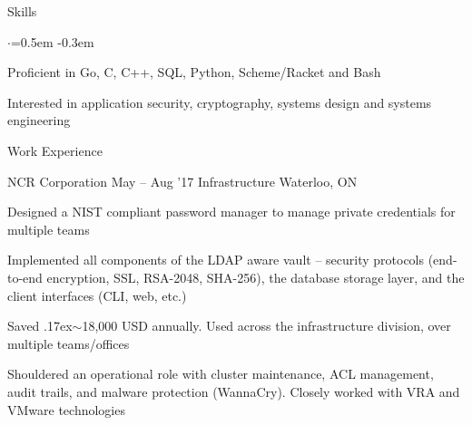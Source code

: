 \documentclass{resume} %
\begin{document}

\begin{rSection}{Skills}
  \vspace {0.3em}
  \begin{list}{$\cdot$}{\leftmargin=0.5em}
    \itemsep -0.3em \vspace{-0.3em}
    \item Proficient in Go, C, C++, SQL, Python, Scheme/Racket and Bash
    \item Interested in application security, cryptography, systems design and
      systems engineering
  \end{list}
  \vspace{0.3em}
\end{rSection}



\begin{rSection}{Work Experience}
  \begin{rSubsection}{NCR Corporation}
		     {May -- Aug '17}
		     {Infrastructure}
		     {Waterloo, ON}
    \item Designed a NIST compliant password manager to manage private
      credentials for multiple teams
    \item Implemented all components of the LDAP aware vault -- security
      protocols (end-to-end encryption, SSL, RSA-2048, SHA-256), the database
      storage layer, and the client interfaces (CLI, web, etc.)
    \item Saved {\raise.17ex\hbox{$\scriptstyle\mathtt{\sim}$}}18,000 USD
      annually. Used across the infrastructure division, over multiple
      teams/offices
    \item Shouldered an operational role with cluster maintenance, ACL management,
      audit trails, and malware protection (WannaCry). Closely worked with VRA
      and VMware technologies
  \end{rSubsection}
\end{rSection} 
\end{document}

